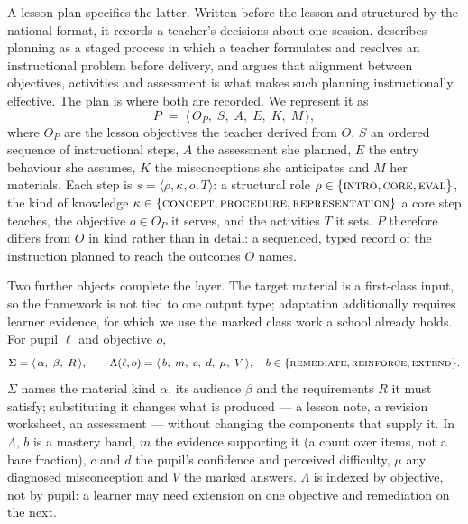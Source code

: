 \documentclass{article}
\begin{document}
A lesson plan specifies the latter. Written before the lesson and structured by the national
format, it records a teacher's decisions about one session. \citet{yinger1980} describes
planning as a staged process in which a teacher formulates and resolves an instructional
problem before delivery, and \citet{biggs1996} argues that alignment between objectives,
activities and assessment is what makes such planning instructionally effective. The plan is
where both are recorded. We represent it as
\begin{equation}
P \;=\; \langle\, O_P,\; S,\; A,\; E,\; K,\; M \,\rangle ,
\label{eq:plan}
\end{equation}
where $O_P$ are the lesson objectives the teacher derived from $O$, $S$ an ordered sequence of
instructional steps, $A$ the assessment she planned, $E$ the entry behaviour she assumes, $K$
the misconceptions she anticipates and $M$ her materials. Each step is
$s=\langle\rho,\kappa,o,T\rangle$: a structural role $\rho\in\{\textsc{intro},\textsc{core},
\textsc{eval}\}$, the kind of knowledge $\kappa\in\{\textsc{concept},\textsc{procedure},
\textsc{representation}\}$ a core step teaches, the objective $o\in O_P$ it serves, and the
activities $T$ it sets. $P$ therefore differs from
$O$ in kind rather than in detail: a sequenced, typed record of the instruction planned to reach
the outcomes $O$ names.

Two further objects complete the layer. The target material is a first-class input, so the
framework is not tied to one output type; adaptation additionally requires learner evidence, for
which we use the marked class work a school already holds. For pupil $\ell$ and objective $o$,
\begin{equation}
\Sigma = \langle\, \alpha,\; \beta,\; R \,\rangle ,
\qquad
\Lambda(\ell,o) = \langle\, b,\; m,\; c,\; d,\; \mu,\; V \,\rangle ,
\quad b \in \{\textsc{remediate},\textsc{reinforce},\textsc{extend}\} .
\label{eq:spec}
\end{equation}
$\Sigma$ names the material kind $\alpha$, its audience $\beta$ and the requirements $R$ it must
satisfy; substituting it changes what is produced --- a lesson note, a revision worksheet, an
assessment --- without changing the components that supply it. In $\Lambda$, $b$ is a mastery
band, $m$ the evidence supporting it (a count over items, not a bare fraction), $c$ and $d$ the
pupil's confidence and perceived difficulty, $\mu$ any diagnosed misconception and $V$ the marked
answers. $\Lambda$ is indexed by objective, not by pupil: a learner may need extension on one
objective and remediation on the next.
\end{document}
